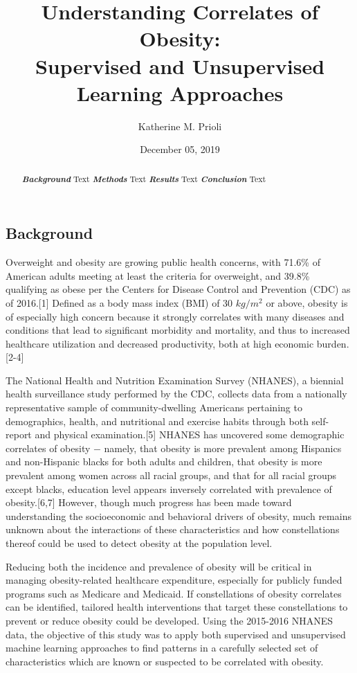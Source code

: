\documentclass[]{article}
\title{Understanding Correlates of Obesity:\\
Supervised and Unsupervised Learning Approaches}
\author{Katherine M. Prioli}
\date{December 05, 2019}
\begin{document}
\maketitle
\begin{abstract}
\textbf{\emph{Background}} Text \textbf{\emph{Methods}} Text
\textbf{\emph{Results}} Text \textbf{\emph{Conclusion}} Text
\end{abstract}

\hypertarget{background}{%
\subsection{\texorpdfstring{\textbf{Background}}{Background}}\label{background}}

Overweight and obesity are growing public health concerns, with 71.6\%
of American adults meeting at least the criteria for overweight, and
39.8\% qualifying as obese per the Centers for Disease Control and
Prevention (CDC) as of 2016.{[}1{]} Defined as a body mass index (BMI)
of 30 \(kg/m^{2}\) or above, obesity is of especially high concern
because it strongly correlates with many diseases and conditions that
lead to significant morbidity and mortality, and thus to increased
healthcare utilization and decreased productivity, both at high economic
burden.{[}2-4{]}

The National Health and Nutrition Examination Survey (NHANES), a
biennial health surveillance study performed by the CDC, collects data
from a nationally representative sample of community-dwelling Americans
pertaining to demographics, health, and nutritional and exercise habits
through both self-report and physical examination.{[}5{]} NHANES has
uncovered some demographic correlates of obesity \(-\) namely, that
obesity is more prevalent among Hispanics and non-Hispanic blacks for
both adults and children, that obesity is more prevalent among women
across all racial groups, and that for all racial groups except blacks,
education level appears inversely correlated with prevalence of
obesity.{[}6,7{]} However, though much progress has been made toward
understanding the socioeconomic and behavioral drivers of obesity, much
remains unknown about the interactions of these characteristics and how
constellations thereof could be used to detect obesity at the population
level.

Reducing both the incidence and prevalence of obesity will be critical
in managing obesity-related healthcare expenditure, especially for
publicly funded programs such as Medicare and Medicaid. If
constellations of obesity correlates can be identified, tailored health
interventions that target these constellations to prevent or reduce
obesity could be developed. Using the 2015-2016 NHANES data, the
objective of this study was to apply both supervised and unsupervised
machine learning approaches to find patterns in a carefully selected set
of characteristics which are known or suspected to be correlated with
obesity.
\end{document}
